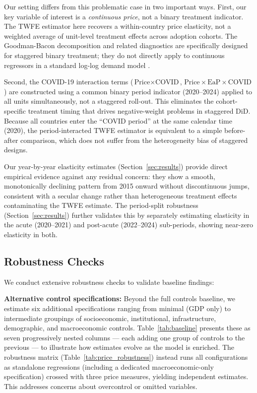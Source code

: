 Our setting differs from this problematic case in two important ways. First, our key variable of interest is a \textit{continuous price}, not a binary treatment indicator. The TWFE estimator here recovers a within-country price elasticity, not a weighted average of unit-level treatment effects across adoption cohorts. The Goodman-Bacon decomposition and related diagnostics are specifically designed for staggered binary treatment; they do not directly apply to continuous regressors in a standard log-log demand model \citep{callaway2021difference}.

Second, the COVID-19 interaction terms ($\text{Price} \times \text{COVID}$, $\text{Price} \times \text{EaP} \times \text{COVID}$) are constructed using a common binary period indicator (2020--2024) applied to all units simultaneously, not a staggered roll-out. This eliminates the cohort-specific treatment timing that drives negative-weight problems in staggered DiD. Because all countries enter the ``COVID period'' at the same calendar time (2020), the period-interacted TWFE estimator is equivalent to a simple before-after comparison, which does not suffer from the heterogeneity bias of staggered designs.

Our year-by-year elasticity estimates (Section~\ref{sec:results}) provide direct empirical evidence against any residual concern: they show a smooth, monotonically declining pattern from 2015 onward without discontinuous jumps, consistent with a secular change rather than heterogeneous treatment effects contaminating the TWFE estimate. The period-split robustness (Section~\ref{sec:results}) further validates this by separately estimating elasticity in the acute (2020--2021) and post-acute (2022--2024) sub-periods, showing near-zero elasticity in both.

\subsection{Robustness Checks}

We conduct extensive robustness checks to validate baseline findings:

\textbf{Alternative control specifications:} Beyond the full controls baseline, we estimate six additional specifications ranging from minimal (GDP only) to intermediate groupings of socioeconomic, institutional, infrastructure, demographic, and macroeconomic controls. Table~\ref{tab:baseline} presents these as seven progressively nested columns --- each adding one group of controls to the previous --- to illustrate how estimates evolve as the model is enriched. The robustness matrix (Table~\ref{tab:price_robustness}) instead runs all \NPerMeasure{} configurations as standalone regressions (including a dedicated macroeconomic-only specification) crossed with three price measures, yielding \RobNSpecs{} independent estimates. This addresses concerns about overcontrol or omitted variables.


